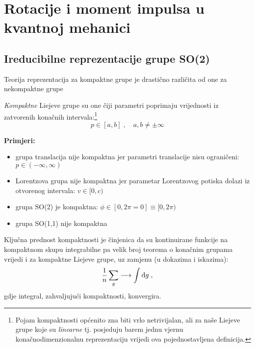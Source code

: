
\chapter{Rotacije i moment impulsa u kvantnoj mehanici}
\label{ch:rotacije}

\section{Ireducibilne reprezentacije grupe SO(2)}

Teorija reprezentacija za kompaktne grupe je drastično različita
 od one za nekompaktne grupe

 \emph{Kompaktne} Liejeve grupe su one čiji parametri poprimaju
   vrijednosti iz zatvorenih konačnih intervala:\footnote{
  Pojam kompaktnosti općenito zna biti vrlo netrivijalan, ali za
   naše Liejeve grupe koje su \emph{linearne} tj. posjeduju barem
   jednu vjernu konačnodimenzionalnu reprezentaciju vrijedi ova
 pojednostavljena definicija.}
\begin{displaymath}
         p \in [a, b]\;,  \quad a,b\neq \pm \infty
\end{displaymath}

\textbf{Primjeri:}
\begin{itemize}
\item grupa translacija nije kompaktna jer parametri translacije
      nisu ograničeni: $p \in (-\infty, \infty)$
\item Lorentzova grupa nije kompaktna jer parametar Lorentzovog
      potiska dolazi iz otvorenog intervala: $v \in [0,c)$
\item grupa SO(2) je kompaktna: $\phi\in[0, 2\pi=0]\equiv[0,2\pi)$
\item grupa SO(1,1) nije kompaktna
\end{itemize}

Ključna prednost kompaktnosti je činjenica da su kontinuirane funkcije
na kompaktnom skupu integrabilne pa 
velik broj teorema o konačnim grupama vrijedi i za kompaktne Liejeve
grupe, uz zamjenu (u dokazima i iskazima):
\begin{displaymath}
    \frac{1}{n} \sum_{g} \longrightarrow \int \textrm{d} g \;,
\end{displaymath}
gdje integral, zahvaljujući kompaktnosti, konvergira.

